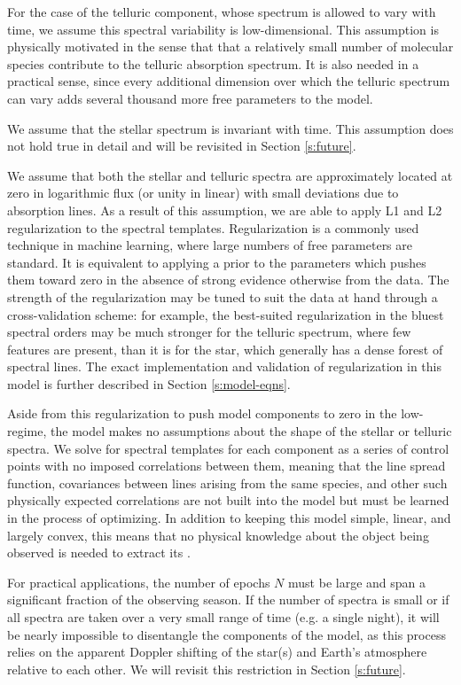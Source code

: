 \documentclass[modern]{aastex62}
\begin{document}
For the case of the telluric component, whose spectrum is allowed to vary with time, we assume this spectral variability is low-dimensional.
This assumption is physically motivated in the sense that that a relatively small number of molecular species contribute to the telluric absorption spectrum.
It is also needed in a practical sense, since every additional dimension over which the telluric spectrum can vary adds several thousand more free parameters to the model.

We assume that the stellar spectrum is invariant with time.
This assumption does not hold true in detail and will be revisited in Section \ref{s:future}.

We assume that both the stellar and telluric spectra are approximately located at zero in logarithmic flux (or unity in linear) with small deviations due to absorption lines.
As a result of this assumption, we are able to apply L1 and L2 regularization to the spectral templates.
Regularization is a commonly used technique in machine learning, where large numbers of free parameters are standard.
It is equivalent to applying a prior to the parameters which pushes them toward zero in the absence of strong evidence otherwise from the data.
The strength of the regularization may be tuned to suit the data at hand through a cross-validation scheme: for example, the best-suited regularization in the bluest spectral orders may be much stronger for the telluric spectrum, where few features are present, than it is for the star, which generally has a dense forest of spectral lines.
The exact implementation and validation of regularization in this model is further described in Section \ref{s:model-eqns}.

Aside from this regularization to push model components to zero in the low-\SNR regime, the model makes no assumptions about the shape of the stellar or telluric spectra.
We solve for spectral templates for each component as a series of control points with no imposed correlations between them, meaning that the line spread function, covariances between lines arising from the same species, and other such physically expected correlations are not built into the model but must be learned in the process of optimizing.
In addition to keeping this model simple, linear, and largely convex, this means that no physical knowledge about the object being observed is needed to extract its \RVs.

For practical applications, the number of epochs $N$ must be large and span a significant fraction of the observing season.
If the number of spectra is small or if all spectra are taken over a very small range of time (e.g. a single night), it will be nearly impossible to disentangle the components of the model, as this process relies on the apparent Doppler shifting of the star(s) and Earth's atmosphere relative to each other.
We will revisit this restriction in Section \ref{s:future}.
\end{document}
